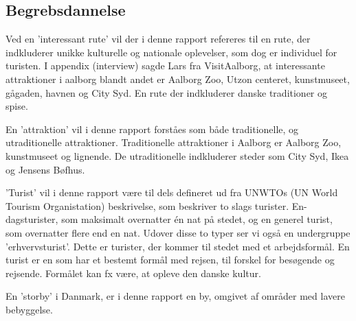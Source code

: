 \subsection{Begrebsdannelse}
Ved en ’interessant rute’ vil der i denne rapport refereres til en rute, der indkluderer unikke kulturelle og nationale oplevelser, som dog er individuel for turisten. I appendix (interview) sagde Lars fra VisitAalborg, at interessante attraktioner i aalborg blandt andet er Aalborg Zoo, Utzon centeret, kunstmuseet, gågaden, havnen og City Syd. En rute der indkluderer danske traditioner og spise. \newline

En ’attraktion’ vil i denne rapport forståes som både traditionelle, og utraditionelle attraktioner. Traditionelle attraktioner i Aalborg er Aalborg Zoo, kunstmuseet og lignende. De utraditionelle indkluderer steder som City Syd, Ikea og Jensens Bøfhus. \newline 

’Turist’ vil i denne rapport være til dels defineret ud fra UNWTOs (UN World Tourism Organistation) beskrivelse, som beskriver to slags turister. En-dagsturister, som maksimalt overnatter én nat på stedet, og en generel turist, som overnatter flere end en nat. Udover disse to typer ser vi også en undergruppe ’erhvervsturist’. Dette er turister, der kommer til stedet med et arbejdsformål. 
En turist er en som har et bestemt formål med rejsen, til forskel for besøgende og rejsende. Formålet kan fx være, at opleve den danske kultur.  \newline

En ’storby’ i Danmark, er i denne rapport en by, omgivet af områder med lavere bebyggelse.
